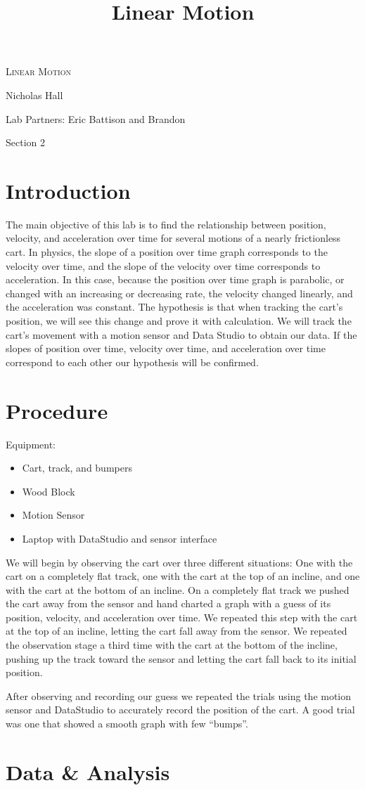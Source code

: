 \documentclass[12pt]{article}
\title{Linear Motion}
\begin{document}
\begin{titlepage}
	\centering
    \vspace*{\fill}
    {\scshape\huge Linear Motion \par}
    
    \vspace{2cm}
    \LARGE Nicholas Hall
    
    \large Lab Partners: Eric Battison and Brandon
    
    \vspace{2cm}
    \large Section 2
    \vspace*{\fill}
\end{titlepage}

\section{Introduction}

The main objective of this lab is to find the relationship between position, velocity, and acceleration over time for several motions of a nearly frictionless cart. In physics, the slope of a position over time graph corresponds to the velocity over time, and the slope of the velocity over time corresponds to acceleration. In this case, because the position over time graph is parabolic, or changed with an increasing or decreasing rate, the velocity changed linearly, and the acceleration was constant. The hypothesis is that when tracking the cart’s position, we will see this change and prove it with calculation. We will track the cart’s movement with a motion sensor and Data Studio to obtain our data. If the slopes of position over time, velocity over time, and acceleration over time correspond to each other our hypothesis will be confirmed.

\section{Procedure}
Equipment:
\begin{itemize}
	\item Cart, track, and bumpers
    \item Wood Block
    \item Motion Sensor
    \item Laptop with DataStudio and sensor interface
\end{itemize}
We will begin by observing the cart over three different situations: One with the cart on a completely flat track, one with the cart at the top of an incline, and one with the cart at the bottom of an incline. On a completely flat track we pushed the cart away from the sensor and hand charted a graph with a guess of its position, velocity, and acceleration over time. We repeated this step with the cart at the top of an incline, letting the cart fall away from the sensor. We repeated the observation stage a third time with the cart at the bottom of the incline, pushing up the track toward the sensor and letting the cart fall back to its initial position.

After observing and recording our guess we repeated the trials using the motion sensor and DataStudio to accurately record the position of the cart. A good trial was one that showed a smooth graph with few ``bumps''. 

\section{Data \& Analysis}
\end{document}
